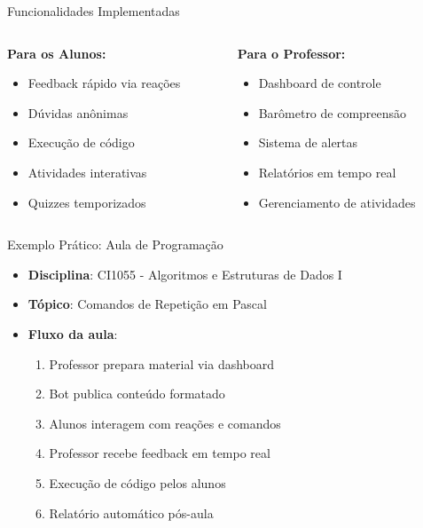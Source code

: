 \documentclass[aspectratio=169]{beamer}
\begin{document}
{\begin{frame}{Funcionalidades Implementadas}
  \begin{columns}
  \begin{column}{0.5\textwidth}
    \textbf{Para os Alunos:}
    \begin{itemize}
    \item Feedback rápido via reações
    \item Dúvidas anônimas
    \item Execução de código
    \item Atividades interativas
    \item Quizzes temporizados
    \end{itemize}
  \end{column}
  \begin{column}{0.5\textwidth}
    \textbf{Para o Professor:}
    \begin{itemize}
    \item Dashboard de controle
    \item Barômetro de compreensão
    \item Sistema de alertas
    \item Relatórios em tempo real
    \item Gerenciamento de atividades
    \end{itemize}
  \end{column}
  \end{columns}
\end{frame}

\begin{frame}{Exemplo Prático: Aula de Programação}
  \begin{itemize}
  \item \textbf{Disciplina}: CI1055 - Algoritmos e Estruturas de Dados I
  \item \textbf{Tópico}: Comandos de Repetição em Pascal
  \item \textbf{Fluxo da aula}:
    \begin{enumerate}
    \item Professor prepara material via dashboard
    \item Bot publica conteúdo formatado
    \item Alunos interagem com reações e comandos
    \item Professor recebe feedback em tempo real
    \item Execução de código pelos alunos
    \item Relatório automático pós-aula
    \end{enumerate}
  \end{itemize}
\end{frame}

}
\end{document}
